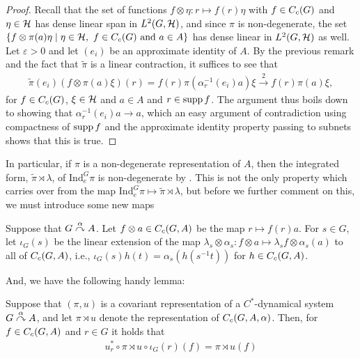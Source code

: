 \begin{proof}
	Recall that the set of functions $ f \otimes \eta \colon r \mapsto f(r) \eta$ with $f \in C_c(G)$ and $\eta \in \mathcal{H}$ has dense linear span in $L^2(G,\mathcal{H})$, and since $\pi$ is non-degenerate, the set $\{ f \otimes \pi(a) \eta \mid \eta \in \mathcal{H}, \ f \in C_c(G) \text{ and } a \in A \}$ has dense linear in $L^2(G, \mathcal{H})$ as well. Let $\varepsilon > 0$ and let $(e_i)$ be an approximate identity of $A$. By the previous remark and the fact that $\tilde{\pi}$ is a linear contraction, it suffices to see that 
	\begin{align*}
		\tilde{\pi}(e_i) (f \otimes \pi(a) \xi)(r)=f(r) \pi(\alpha_{r}^{-1}(e_i)a) \xi   \stackrel 2 \to f(r) \pi(a) \xi,
	\end{align*}
	for $f \in C_c(G)$, $\xi \in \mathcal{H}$ and $a \in A$ and $r \in \operatorname{supp} f$. The argument thus boils down to showing that $\alpha_r^{-1}(e_i) a \to a$, which an easy argument of contradiction using compactness of $\operatorname{supp} f$ and the approximate identity property passing to subnets shows that this is true.
\end{proof}
\begin{remark}
	In particular, if $\pi$ is a non-degenerate representation of $A$, then the integrated form, $\tilde{\pi} \rtimes \lambda$, of $\mathrm{Ind}_e^G \pi$ is non-degenerate by . This is not the only property which carries over from the map $\mathrm{Ind}_e^G \pi \mapsto \tilde{\pi} \rtimes \lambda$, but before we further comment on this, we must introduce some new maps
\end{remark}
\begin{definition}
	Suppose that $G \stackrel{\alpha}{\curvearrowright} A$. Let $f \otimes a  \in C_c(G,A)$ be the map $r \mapsto f(r)a$. For $s \in G$, let $\iota_G(s)$ be the linear extension of the map $\lambda_s \otimes \alpha_s \colon f \otimes a \mapsto \lambda_s f \otimes \alpha_s(a)$ to all of $C_c(G,A)$, i.e., $\iota_G(s) h(t) = \alpha_s(h(s^{-1}t))$ for $h \in C_c(G,A)$.
\end{definition}
And, we have the following handy lemma:
\begin{lemma}
	Suppose that $(\pi,u)$ is a covariant representation of a $C^*$-dynamical system $G \stackrel{\alpha}{\curvearrowright} A$, and let $\pi \rtimes u$ denote the representation of $C_c(G,A,\alpha)$. Then, for $f \in C_c(G,A)$ and $r \in G$ it holds that
	\begin{align*}
		 u_r^*  \circ \pi \rtimes u \circ \iota_G(r) (f) =   \pi \rtimes u (f)
	\end{align*}
	\label{cross:iotaG}
\end{lemma}

